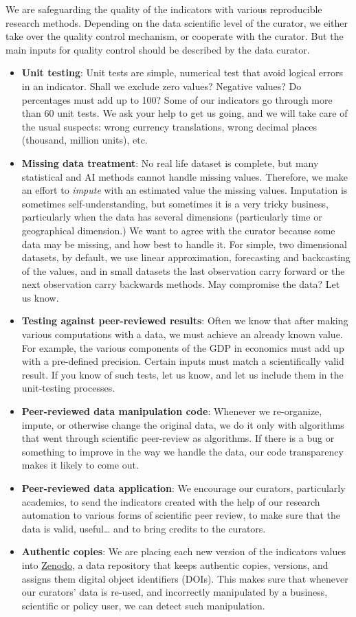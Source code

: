 \documentclass[
  a4paper,
  openany, a4paper, oneside]{book}
\begin{document}
We are safeguarding the quality of the indicators with various reproducible research methods. Depending on the data scientific level of the curator, we either take over the quality control mechanism, or cooperate with the curator. But the main inputs for quality control should be described by the data curator.

\begin{itemize}
\item
  \textbf{Unit testing}: Unit tests are simple, numerical test that avoid logical errors in an indicator. Shall we exclude zero values? Negative values? Do percentages must add up to 100? Some of our indicators go through more than 60 unit tests. We ask your help to get us going, and we will take care of the usual suspects: wrong currency translations, wrong decimal places (thousand, million units), etc.
\item
  \textbf{Missing data treatment}: No real life dataset is complete, but many statistical and AI methods cannot handle missing values. Therefore, we make an effort to \emph{impute} with an estimated value the missing values. Imputation is sometimes self-understanding, but sometimes it is a very tricky business, particularly when the data has several dimensions (particularly time or geographical dimension.) We want to agree with the curator because some data may be missing, and how best to handle it. For simple, two dimensional datasets, by default, we use linear approximation, forecasting and backcasting of the values, and in small datasets the last observation carry forward or the next observation carry backwards methods. May compromise the data? Let us know.
\item
  \textbf{Testing against peer-reviewed results}: Often we know that after making various computations with a data, we must achieve an already known value. For example, the various components of the GDP in economics must add up with a pre-defined precision. Certain inputs must match a scientifically valid result. If you know of such tests, let us know, and let us include them in the unit-testing processes.
\item
  \textbf{Peer-reviewed data manipulation code}: Whenever we re-organize, impute, or otherwise change the original data, we do it only with algorithms that went through scientific peer-review as algorithms. If there is a bug or something to improve in the way we handle the data, our code transparency makes it likely to come out.
\item
  \textbf{Peer-reviewed data application}: We encourage our curators, particularly academics, to send the indicators created with the help of our research automation to various forms of scientific peer review, to make sure that the data is valid, useful\ldots{} and to bring credits to the curators.
\item
  \textbf{Authentic copies}: We are placing each new version of the indicators values into \href{https://zenodo.org/}{Zenodo}, a data repository that keeps authentic copies, versions, and assigns them digital object identifiers (DOIs). This makes sure that whenever our curators' data is re-used, and incorrectly manipulated by a business, scientific or policy user, we can detect such manipulation.
\end{itemize}
\end{document}
